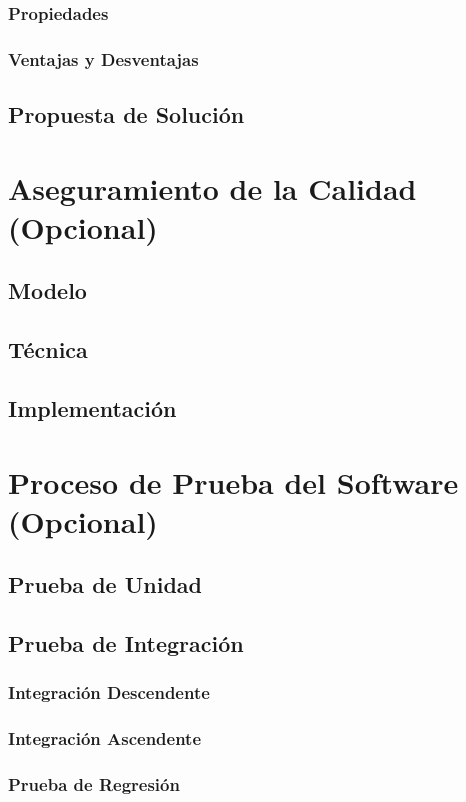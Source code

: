\documentclass[letter,12pt]{report}
\newcommand\rojo[1]{\textcolor[rgb]{1,0,0}{#1}}
\begin{document}
\subsection{Propiedades}
\subsection{Ventajas y Desventajas}

\section{Propuesta de Solución}



\chapter{Aseguramiento de la Calidad (\rojo{Opcional})}\label{calidad}
\section{Modelo}
\section{Técnica}
\section{Implementación}

\chapter{Proceso de Prueba del Software (\rojo{Opcional})}\label{prueba}
\section{Prueba de Unidad}
\section{Prueba de Integración}
\subsection{Integración Descendente}
\subsection{Integración Ascendente}
\subsection{Prueba de Regresión}
\end{document}
